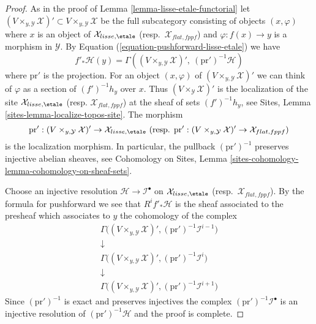 \begin{proof}
As in the proof of Lemma \ref{lemma-lisse-etale-functorial}
let $(V \times_{y, \mathcal{Y}} \mathcal{X})' \subset
V \times_{y, \mathcal{Y}} \mathcal{X}$ be the full subcategory
consisting of objects $(x, \varphi)$ where $x$ is an object of
$\mathcal{X}_{lisse,\etale}$ (resp.\ $\mathcal{X}_{flat,fppf}$)
and $\varphi : f(x) \to y$ is a morphism in $\mathcal{Y}$.
By Equation (\ref{equation-pushforward-lisse-etale}) 
we have
$$
f'_*\mathcal{H}(y) =
\Gamma((V \times_{y, \mathcal{Y}} \mathcal{X})',
\ (\text{pr}')^{-1}\mathcal{H})
$$
where $\text{pr}'$ is the projection. For an object $(x, \varphi)$
of $(V \times_{y, \mathcal{Y}} \mathcal{X})'$
we can think of $\varphi$ as a section of $(f')^{-1}h_y$ over $x$.
Thus $(V \times_\mathcal{Y} \mathcal{X})'$ is the localization
of the site $\mathcal{X}_{lisse,\etale}$
(resp. $\mathcal{X}_{flat,fppf}$) at the sheaf of sets $(f')^{-1}h_y$, see
Sites, Lemma \ref{sites-lemma-localize-topos-site}. The morphism
$$
\text{pr}' : (V \times_{y, \mathcal{Y}} \mathcal{X})'
\to \mathcal{X}_{lisse,\etale}
\ (\text{resp. }
\text{pr}' : (V \times_{y, \mathcal{Y}} \mathcal{X})'
\to \mathcal{X}_{flat,fppf})
$$
is the localization morphism.
In particular, the pullback $(\text{pr}')^{-1}$ preserves
injective abelian sheaves, see
Cohomology on Sites, Lemma
\ref{sites-cohomology-lemma-cohomology-on-sheaf-sets}.

\medskip\noindent
Choose an injective resolution $\mathcal{H} \to \mathcal{I}^\bullet$
on $\mathcal{X}_{lisse,\etale}$ (resp.\ $\mathcal{X}_{flat,fppf}$).
By the formula for pushforward we see that $R^if'_*\mathcal{H}$ is the
sheaf associated to the presheaf which associates to $y$ the cohomology
of the complex
$$
\begin{matrix}
\Gamma\Big((V \times_{y, \mathcal{Y}} \mathcal{X})',
(\text{pr}')^{-1}\mathcal{I}^{i - 1}\Big) \\
\downarrow \\
\Gamma\Big((V \times_{y, \mathcal{Y}} \mathcal{X})',
(\text{pr}')^{-1}\mathcal{I}^i\Big) \\
\downarrow \\
\Gamma\Big((V \times_{y, \mathcal{Y}} \mathcal{X})',
(\text{pr}')^{-1}\mathcal{I}^{i + 1}\Big)
\end{matrix}
$$
Since $(\text{pr}')^{-1}$ is exact and preserves injectives the
complex $(\text{pr}')^{-1}\mathcal{I}^\bullet$ is an
injective resolution of $(\text{pr}')^{-1}\mathcal{H}$
and the proof is complete.
\end{proof}

